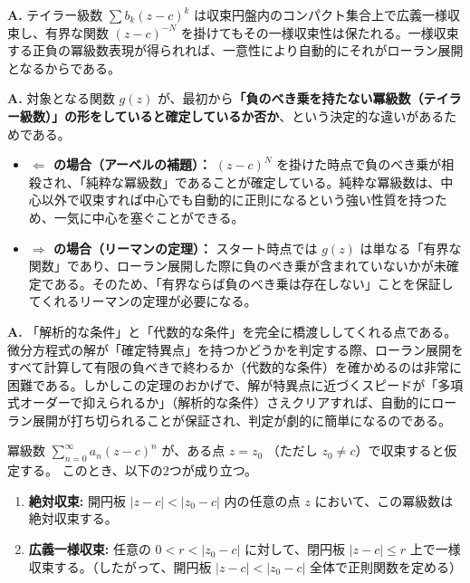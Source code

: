 \begin{Q}
\textbf{A.} テイラー級数 $\sum b_k (z-c)^k$ は収束円盤内のコンパクト集合上で広義一様収束し、有界な関数 $(z-c)^{-N}$ を掛けてもその一様収束性は保たれる。一様収束する正負の冪級数表現が得られれば、一意性により自動的にそれがローラン展開となるからである。
\end{Q}

\begin{Q}
\textbf{A.} 対象となる関数 $g(z)$ が、最初から\textbf{「負のべき乗を持たない冪級数（テイラー級数）」の形をしていると確定しているか否か}、という決定的な違いがあるためである。
\begin{itemize}
    \item \textbf{$\Leftarrow$ の場合（アーベルの補題）：} $(z-c)^N$ を掛けた時点で負のべき乗が相殺され、「純粋な冪級数」であることが確定している。純粋な冪級数は、中心以外で収束すれば中心でも自動的に正則になるという強い性質を持つため、一気に中心を塞ぐことができる。
    \item \textbf{$\Rightarrow$ の場合（リーマンの定理）：} スタート時点では $g(z)$ は単なる「有界な関数」であり、ローラン展開した際に負のべき乗が含まれていないかが未確定である。そのため、「有界ならば負のべき乗は存在しない」ことを保証してくれるリーマンの定理が必要になる。
\end{itemize}
\end{Q}

\begin{Q}
\textbf{A.} 「解析的な条件」と「代数的な条件」を完全に橋渡ししてくれる点である。
微分方程式の解が「確定特異点」を持つかどうかを判定する際、ローラン展開をすべて計算して有限の負べきで終わるか（代数的な条件）を確かめるのは非常に困難である。しかしこの定理のおかげで、解が特異点に近づくスピードが「多項式オーダーで抑えられるか」（解析的な条件）さえクリアすれば、自動的にローラン展開が打ち切られることが保証され、判定が劇的に簡単になるのである。
\end{Q}
\begin{theorem}[アーベルの補題]\label{thm:abels_lemma}
    冪級数 $\sum_{n=0}^{\infty} a_n (z-c)^n$ が、ある点 $z = z_0$ （ただし $z_0 \neq c$）で収束すると仮定する。
    このとき、以下の2つが成り立つ。
    \begin{enumerate}
        \item \textbf{絶対収束:} 開円板 $|z-c| < |z_0-c|$ 内の任意の点 $z$ において、この冪級数は絶対収束する。
        \item \textbf{広義一様収束:} 任意の $0 < r < |z_0-c|$ に対して、閉円板 $|z-c| \le r$ 上で一様収束する。（したがって、開円板 $|z-c| < |z_0-c|$ 全体で正則関数を定める）
    \end{enumerate}
\end{theorem}

